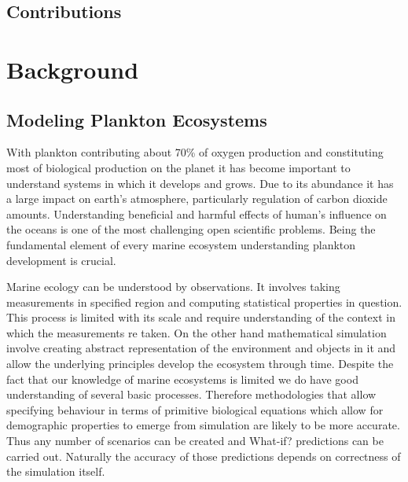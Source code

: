 \documentclass[12pt, a4paper]{report}
\begin{document}
\section{Contributions}\label{sec:intro-contrib}


\chapter{Background}\label{ch:bkg}

\section{Modeling Plankton Ecosystems}\label{sec:model-plankton-eco}

With plankton contributing about 70\% of oxygen production and
constituting most of biological production on the planet it has
become important to understand systems in which it develops and
grows. Due to its abundance it has a large impact on earth's
atmosphere, particularly regulation of carbon dioxide amounts.
Understanding beneficial and harmful effects of human's influence
on the oceans is one of the most challenging open scientific
problems. Being the fundamental element of every marine ecosystem
understanding plankton development is crucial.

Marine ecology can be understood by observations. It involves
taking measurements in specified region and computing statistical
properties in question. This process is limited with its scale
and require understanding of the context in which the measurements
re taken. On the other hand mathematical simulation involve creating
abstract representation of the environment and objects in it and
allow the underlying principles develop the ecosystem through time.
Despite the fact that our knowledge of marine ecosystems is limited
we do have good understanding of several basic processes. Therefore
methodologies that allow specifying behaviour in terms of primitive
biological equations which allow for demographic properties to emerge
from simulation are likely to be more accurate. Thus any number of
scenarios can be created and What-if? predictions can be carried out.
Naturally the accuracy of those predictions depends on correctness
of the simulation itself.
\end{document}
